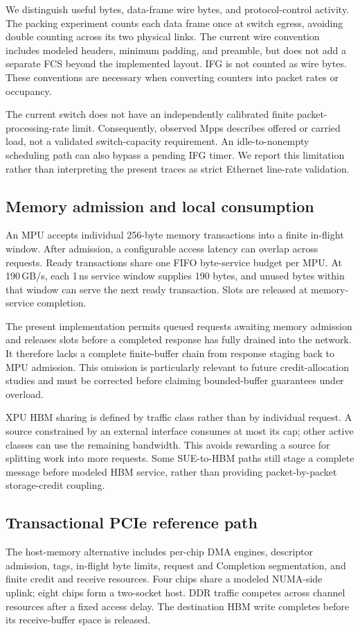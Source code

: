\documentclass[conference]{IEEEtran}
\begin{document}
We distinguish useful bytes, data-frame wire bytes, and protocol-control activity. The packing experiment counts each data frame once at switch egress, avoiding double counting across its two physical links. The current wire convention includes modeled headers, minimum padding, and preamble, but does not add a separate FCS beyond the implemented layout. IFG is not counted as wire bytes. These conventions are necessary when converting counters into packet rates or occupancy.

The current switch does not have an independently calibrated finite packet-processing-rate limit. Consequently, observed Mpps describes offered or carried load, not a validated switch-capacity requirement. An idle-to-nonempty scheduling path can also bypass a pending IFG timer. We report this limitation rather than interpreting the present traces as strict Ethernet line-rate validation.

\subsection{Memory admission and local consumption}
An MPU accepts individual 256-byte memory transactions into a finite in-flight window. After admission, a configurable access latency can overlap across requests. Ready transactions share one FIFO byte-service budget per MPU. At 190\,GB/s, each 1\,ns service window supplies 190 bytes, and unused bytes within that window can serve the next ready transaction. Slots are released at memory-service completion.

The present implementation permits queued requests awaiting memory admission and releases slots before a completed response has fully drained into the network. It therefore lacks a complete finite-buffer chain from response staging back to MPU admission. This omission is particularly relevant to future credit-allocation studies and must be corrected before claiming bounded-buffer guarantees under overload.

XPU HBM sharing is defined by traffic class rather than by individual request. A source constrained by an external interface consumes at most its cap; other active classes can use the remaining bandwidth. This avoids rewarding a source for splitting work into more requests. Some SUE-to-HBM paths still stage a complete message before modeled HBM service, rather than providing packet-by-packet storage-credit coupling.

\subsection{Transactional PCIe reference path}
The host-memory alternative includes per-chip DMA engines, descriptor admission, tags, in-flight byte limits, request and Completion segmentation, and finite credit and receive resources. Four chips share a modeled NUMA-side uplink; eight chips form a two-socket host. DDR traffic competes across channel resources after a fixed access delay. The destination HBM write completes before its receive-buffer space is released.
\end{document}
